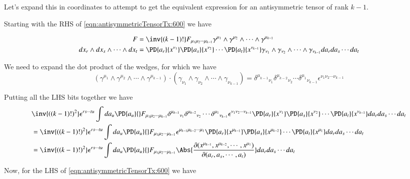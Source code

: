 Let's expand this in coordinates to attempt to get the equivalent expression for an antisymmetric tensor of rank $k-1$.

Starting with the RHS of \ref{eqn:antisymmetricTensorTx:600} we have

\begin{align}\label{eqn:antisymmetricTensorTx:610}
F &= \inv{(k-1)!}
F_{\mu_1 \mu_2 \cdots \mu_{k-1} }
\gamma^{\mu_1} \wedge \gamma^{ \mu_2 } \wedge \cdots \wedge \gamma^{\mu_{k-1}} 
\\
dx_r \wedge dx_s \wedge \cdots \wedge dx_t &=
\PD{a_r}{x^{\nu_1}}
\PD{a_s}{x^{\nu_2}}
\cdots
\PD{a_t}{x^{\nu_{k-1}}}
\gamma_{\nu_1} \wedge \gamma_{ \nu_2 } \wedge \cdots \wedge \gamma_{\nu_{k-1}}
da_r da_s \cdots da_t
\end{align}

We need to expand the dot product of the wedges, for which we have
\begin{equation}\label{eqn:antisymmetricTensorTx:620}
\left( 
\gamma^{\mu_1} \wedge \gamma^{ \mu_2 } \wedge \cdots \wedge \gamma^{\mu_{k-1}} 
\right) 
\cdot
\left( 
\gamma_{\nu_1} \wedge \gamma_{ \nu_2 } \wedge \cdots \wedge \gamma_{\nu_{k-1}}
\right) 
=
{\delta^{\mu_{k-1}}}_{\nu_1}  {\delta^{ \mu_{k-2} }}_{\nu_2}  \cdots  {\delta^{\mu_{1}} }_{\nu_{k-1}}
\epsilon^{\nu_1 \nu_2 \cdots \nu_{k-1}}
\end{equation}

Putting all the LHS bits together we have
\begin{align*}
&\inv{((k-1)!)^2} \epsilon^{ r s \cdots t u } \int da_u \PD{a_{u}}{} F_{\mu_1 \mu_2 \cdots \mu_{k-1} }
{\delta^{\mu_{k-1}}}_{\nu_1}  {\delta^{ \mu_{k-2} }}_{\nu_2}  \cdots  {\delta^{\mu_{1}} }_{\nu_{k-1}}
\epsilon^{\nu_1 \nu_2 \cdots \nu_{k-1}}
\PD{a_r}{x^{\nu_1}}
\PD{a_s}{x^{\nu_2}}
\cdots
\PD{a_t}{x^{\nu_{k-1}}}
da_r da_s \cdots da_t \\
&=\inv{((k-1)!)^2} \epsilon^{ r s \cdots t u } \int da_u \PD{a_{u}}{} F_{\mu_1 \mu_2 \cdots \mu_{k-1} }
\epsilon^{\mu_{k-1} \mu_{k-2} \cdots \mu_{1}}
\PD{a_r}{x^{\mu_{k-1}}}
\PD{a_s}{x^{\mu_{k-2}}}
\cdots
\PD{a_t}{x^{\mu_1}}
da_r da_s \cdots da_t \\
&=
\inv{((k-1)!)^2} \epsilon^{ r s \cdots t u } \int da_u \PD{a_{u}}{} F_{\mu_1 \mu_2 \cdots \mu_{k-1} }
\Abs{\frac{\partial(
x^{\mu_{k-1}},x^{\mu_{k-2}},\cdots,x^{\mu_1}
)}{\partial(a_r, a_s, \cdots, a_t)}}
da_r da_s \cdots da_t \\
\end{align*}

Now, for the LHS of \ref{eqn:antisymmetricTensorTx:600} we have

